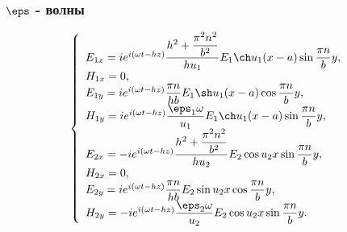 \subsubsection{\(\boldsymbol{\eps}\) - волны}
\[
    \left\{
    \begin{array}{l}
        E_{1x} = i e^{i(\omega t - h z)}\frac{h^2 + \frac{\pi^2 n^2}{b^2}}
            {hu_1}E_1\ch u_1 (x-a) \sin \frac{\pi n}{b}y,\\
        H_{1x} = 0,\\
        E_{1y} = i e^{i(\omega t - h z)}\frac{\pi n}{hb}
            E_1\sh u_1 (x-a) \cos \frac{\pi n}{b}y,\\
        H_{1y} = i e^{i(\omega t - h z)}\frac{\eps_1\omega}{u_1}E_1
            \ch u_1 (x-a) \sin \frac{\pi n}{b}y,\\

        E_{2x} = -i e^{i(\omega t - h z)}\frac{h^2 + \frac{\pi^2 n^2}{b^2}}
            {hu_2}E_2\cos u_2 x \sin \frac{\pi n}{b}y,\\
        H_{2x} = 0,\\
        E_{2y} = i e^{i(\omega t - h z)}\frac{\pi n}{hb}
            E_2\sin u_2 x \cos \frac{\pi n}{b}y,\\
        H_{2y} = -i e^{i(\omega t - h z)} \frac{\eps_2\omega}{u_2}
            E_2\cos u_2 x \sin \frac{\pi n}{b}y.\\
    \end{array}
    \right.
\]
